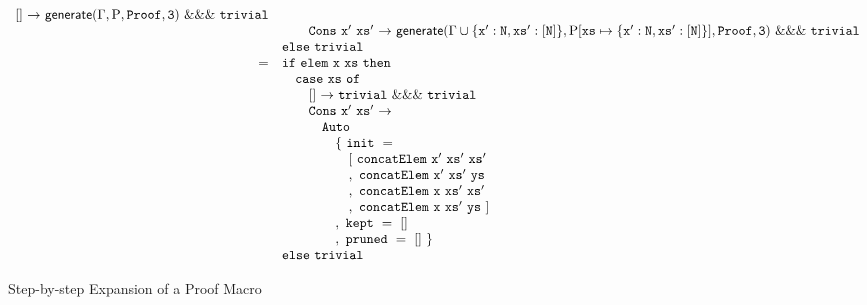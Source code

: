 \begin{figure*}
\begin{minipage}{\textwidth}
\begin{align*}
\begin{array}{rl}
            \mathtt{[]}~\mathtt{\rightarrow}~\mathsf{generate}(\Gamma, \mathrm{P}, \mathtt{Proof}, \mathtt{3})~\mathtt{\&\&\&}~\mathtt{trivial}
            \\& \hspace{2em}
            \mathtt{Cons~x'~xs'}~\mathtt{\rightarrow}~\mathsf{generate}(\Gamma\cup \{\mathtt{x'}:\mathtt{N}, \mathtt{xs'}:\mathtt{[N]}\}, \mathrm{P}[ \mathtt{xs} \mapsto \{ \mathtt{x'}:\mathtt{N}, \mathtt{xs'}:\mathtt{[N]} \} ], \mathtt{Proof}, \mathtt{3})~\mathtt{\&\&\&}~\mathtt{trivial}
        \\& \mathtt{else}~\mathtt{trivial}
      \\ =&
        \mathtt{if}~\mathtt{elem~x~xs}~\mathtt{then}
        \\& \hspace{1em} 
          \mathtt{case}~\mathtt{xs}~\mathtt{of}
          \\& \hspace{2em}
            \mathtt{[]}~\mathtt{\rightarrow}~\mathtt{trivial}~\mathtt{\&\&\&}~\mathtt{trivial}
            \\& \hspace{2em}
            \mathtt{Cons~x'~xs'}~\mathtt{\rightarrow}
            \\& \hspace{3em} \mathtt{Auto}
            \\& \hspace{4em} \mathtt{\{~init~=}
            \\& \hspace{5em} \mathtt{[~concatElem~x'~xs'~xs'}
            \\& \hspace{5em} \mathtt{,~concatElem~x'~xs'~ys}
            \\& \hspace{5em} \mathtt{,~concatElem~x~xs'~xs'}
            \\& \hspace{5em} \mathtt{,~concatElem~x~xs'~ys~]}
            \\& \hspace{4em} \mathtt{,~kept~=~[]}
            \\& \hspace{4em} \mathtt{,~pruned~=~[]~\}}
        \\& \mathtt{else}~\mathtt{trivial}
    \end{array} \end{align*}
  \end{minipage}
  \caption{Step-by-step Expansion of a Proof Macro}
  \label{fig:step-by-step}
\end{figure*}

